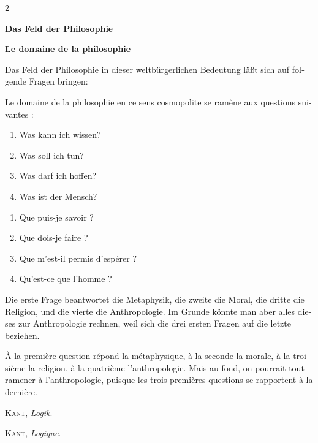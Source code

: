 \documentclass[a4paper,12pt]{article}
\newcommand\chunks[2]{%
\begin{leftcolumn*}\begin{otherlanguage}{german}%
{#1}%
\end{otherlanguage}\end{leftcolumn*}%
\begin{rightcolumn}\begin{otherlanguage}{french}%
{#2}%
\end{otherlanguage}\end{rightcolumn}%
}
\begin{document}
\thispagestyle{empty}
\setlength{\columnsep}{8mm}
\setlength{\columnseprule}{0.4pt}

\begin{paracol}{2}
  \chunks{\begin{center}
          \textbf{Das Feld der Philosophie}
          \end{center}}
         {\begin{center}
          \textbf{Le domaine de la philosophie}
          \end{center}}
  
  \chunks{Das Feld der Philosophie in dieser weltbürgerlichen Bedeutung läßt sich auf folgende Fragen bringen:}
         {Le domaine de la philosophie en ce sens cosmopolite\footnotemark{} se ramène aux questions suivantes :}
  \chunks{\begin{enumerate}
  \item Was kann ich wissen?
  \item Was soll ich tun?
  \item Was darf ich hoffen?
  \item Was ist der Mensch?
\end{enumerate}}
         {\begin{enumerate}
  \item Que puis-je savoir ?
  \item Que dois-je faire ?
  \item Que m'est-il permis d'espérer ?
  \item Qu'est-ce que l'homme ?
\end{enumerate}}
  \chunks{Die erste Frage beantwortet die Metaphysik, die zweite die Moral, die dritte die Religion, und die vierte die Anthropologie. Im Grunde könnte man aber alles dieses zur Anthropologie rechnen, weil sich die drei ersten Fragen auf die letzte beziehen.}
         {À la première question répond la métaphysique, à la seconde la morale, à la troisième la religion, à la quatrième l'anthropologie. Mais au fond, on pourrait tout ramener à l'anthropologie, puisque les trois premières questions se rapportent à la dernière.}
  
  \chunks{\begin{flushright}
          \large\textsc{Kant}, \textit{Logik}.
          \end{flushright}}
         {\begin{flushright}
          \large\textsc{Kant}, \textit{Logique}.
          \end{flushright}}
\end{paracol}
\end{document}

